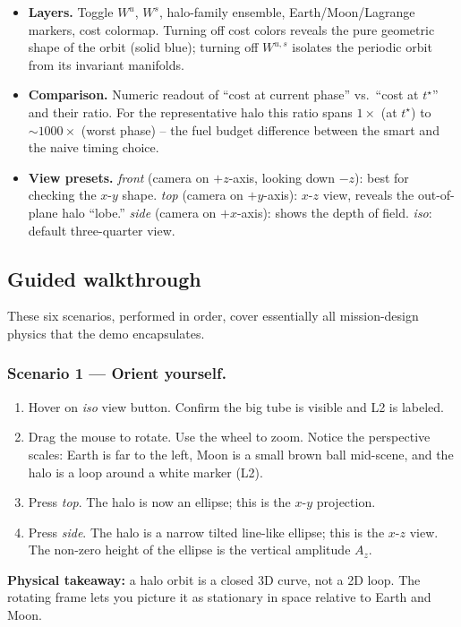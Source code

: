 \documentclass[11pt,a4paper]{article}
\begin{document}
\begin{itemize}[leftmargin=*]
  \item \textbf{Layers.}
    Toggle $W^u$, $W^s$, halo-family ensemble, Earth/Moon/Lagrange markers, cost colormap. Turning off cost colors reveals the pure geometric shape of the orbit (solid blue); turning off $W^{u,s}$ isolates the periodic orbit from its invariant manifolds.

  \item \textbf{Comparison.}
    Numeric readout of ``cost at current phase'' vs.\ ``cost at $t^\star$'' and their ratio. For the representative halo this ratio spans $1\times$ (at $t^\star$) to $\sim 1000\times$ (worst phase) -- the fuel budget difference between the smart and the naive timing choice.

  \item \textbf{View presets.}
    \emph{front} (camera on $+z$-axis, looking down $-z$): best for checking the $x$-$y$ shape. \emph{top} (camera on $+y$-axis): $x$-$z$ view, reveals the out-of-plane halo ``lobe.'' \emph{side} (camera on $+x$-axis): shows the depth of field. \emph{iso}: default three-quarter view.
\end{itemize}

\subsection{Guided walkthrough}\label{sec:demo:walk}

These six scenarios, performed in order, cover essentially all mission-design physics that the demo encapsulates.

\subsubsection*{Scenario 1 --- Orient yourself.}
\begin{enumerate}[leftmargin=*]
  \item Hover on \emph{iso} view button. Confirm the big tube is visible and L2 is labeled.
  \item Drag the mouse to rotate. Use the wheel to zoom. Notice the perspective scales: Earth is far to the left, Moon is a small brown ball mid-scene, and the halo is a loop around a white marker (L2).
  \item Press \emph{top}. The halo is now an ellipse; this is the $x$-$y$ projection.
  \item Press \emph{side}. The halo is a narrow tilted line-like ellipse; this is the $x$-$z$ view. The non-zero height of the ellipse is the vertical amplitude $A_z$.
\end{enumerate}
\textbf{Physical takeaway:} a halo orbit is a closed 3D curve, not a 2D loop. The rotating frame lets you picture it as stationary in space relative to Earth and Moon.
\end{document}
